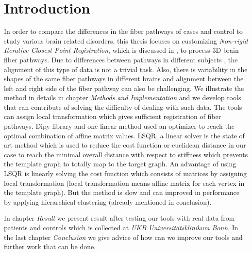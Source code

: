 \documentclass[../structure.tex]{subfiles}
\begin{document}
\chapter{Introduction}
In order to compare the differences in the fiber pathways of cases and control to study various brain related disorders, this thesis focuses on customizing \textit{Non-rigid Iterative Closest Point Registration}, which is discussed in \cite{Amberg2007}, to process 3D brain fiber pathways. Due to differences between pathways in different subjects , the alignment of this type of data is not a trivial task. Also, there is variability in the shapes of the same fiber pathways in different brains and alignment between the left and right side of the fiber pathway can also be challenging. We illustrate the method in details in chapter \textit{Methods and Implementation} and we develop tools that can contribute of solving the difficulty of dealing with such data. The tools can assign local transformation which gives sufficient registration of fiber pathways. Dipy library and one linear method used an optimizer to reach the optimal combination of affine matrix values.
LSQR, a linear solver is the state of art method which is used to reduce the cost function or euclidean distance in our case to reach the minimal overall distance with respect to stiffness which prevents the template graph to totally map to the target graph.
An advantage of using LSQR is linearly solving the cost function which consists of matrices by assigning local transformation (local transformation means affine matrix for each vertex in the template graph). But the method is slow and can improved in performance by applying hierarchical clustering (already mentioned in conclusion).

In chapter \textit{Result} we present result after testing our tools with real data from patients and controls which is collected at \textit{UKB Universitätsklinikum Bonn}. In the last chapter \textit{Conclusion} we give advice of how can we improve our tools and further work that can be done.
\end{document}
